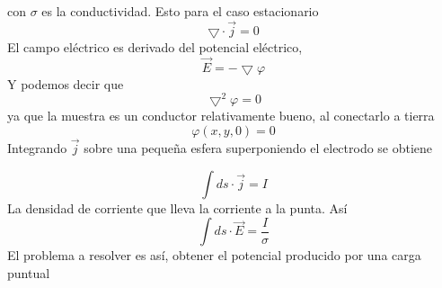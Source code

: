 \documentclass[a4paper,11pt,]{book}
\begin{document}
con $\sigma$ es la conductividad. Esto para el caso estacionario
\begin{equation}
\bigtriangledown \cdot \vec{j} = 0
\end{equation}
El campo eléctrico es derivado del potencial eléctrico,
\begin{equation}
\vec{E} =-\bigtriangledown \varphi	
\end{equation}
Y podemos decir que
\begin{equation}
\bigtriangledown^{2} \varphi=0	
\end{equation}
ya que la muestra es un conductor relativamente bueno, al conectarlo a tierra
\begin{equation}
\varphi(x,y,0)=0	
\end{equation}
Integrando $\vec{j}$ sobre una pequeña esfera superponiendo el electrodo se obtiene 

\begin{equation}
\int ds \cdot \vec{j} = I  	
\end{equation}
La densidad de corriente que lleva la corriente a la punta. Así
\begin{equation}
\int ds \cdot \vec{E} = \dfrac{I}{\sigma} 	
\end{equation}
El problema a resolver es así, obtener el potencial producido por una carga puntual
\end{document}
